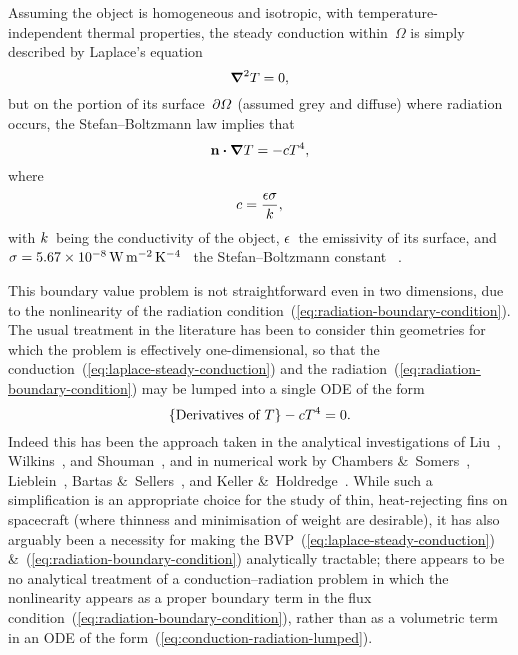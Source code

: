 Assuming the object is homogeneous and isotropic,
with temperature-independent thermal properties,
the steady conduction within~$\Omega$
is simply described by Laplace's equation
\begin{equation}
  \mathop{}\!\boldsymbol{\mathbf{\nabla}}^2 T = 0,
  \label{eq:laplace-steady-conduction}
\end{equation}
but on the portion of its surface~$\mathop{}\!\partial \varOmega$
(assumed grey and diffuse) where radiation occurs,
the Stefan--Boltzmann law implies that
\begin{equation}
  \mathop{}\!\boldsymbol{\mathbf{n}} \boldsymbol{\cdot} \mathop{}\!\boldsymbol{\mathbf{\nabla}} T = - c T^4,
  \label{eq:radiation-boundary-condition}
\end{equation}
where
\begin{equation}
  c = \frac{\epsilon \sigma}{k},
  \label{eq:radiation-constant}
\end{equation}
with $k$~being the conductivity of the object,
$\epsilon$~the emissivity of its surface,
and $\stefan = \SI{5.67e-8}{\watt \per\metre\squared \per\kelvin\tothe{4}}$~%
the Stefan--Boltzmann constant~%
\cite{tiesinga-2019-2018-codata-recommended-constants}.

This boundary value problem is not straightforward
even in two dimensions,
due to the nonlinearity of
the radiation condition~(\ref{eq:radiation-boundary-condition}).
The usual treatment in the literature has been to consider thin geometries
for which the problem is effectively one-dimensional,
so that the conduction~(\ref{eq:laplace-steady-conduction})
and the radiation~(\ref{eq:radiation-boundary-condition})
may be lumped into a single ODE of the form
\begin{equation}
  \{\textnormal{Derivatives of~$T$}\} - c T^4 = 0.
  \label{eq:conduction-radiation-lumped}
\end{equation}
Indeed this has been the approach taken in the analytical investigations of
Liu~\cite{liu-1960-minimum-rectangular-radiating-fins},
Wilkins~\cite{
  wilkins-1960-minumum-mass-fins-radiation,
  wilkins-1961-minimum-mass-fins-thickness,
  wilkins-1962-minimum-mass-fins-gradients,
  wilkins-1974-optimum-shapes-convection-radiation
},
and
Shouman~\cite{shouman-1968-exact-radiation-convection-fin},
and in numerical work by
Chambers \&~Somers~\cite{chambers-1959-radiation-fin-efficiency-circular},
Lieblein~\cite{lieblein-1959-radiant-fin-constant-thickness},
Bartas \&~Sellers~\cite{bartas-1960-radiation-fin-effectiveness},
and
Keller \&~Holdredge~\cite{keller-1970-radiation-annular-fins-trapezoidal}.
While such a simplification is an appropriate choice
for the study of thin, heat-rejecting fins on spacecraft
(where thinness and minimisation of weight are desirable),
it has also arguably been a necessity
for making the BVP~(\ref{eq:laplace-steady-conduction})
\&~(\ref{eq:radiation-boundary-condition}) analytically tractable;
there appears to be no analytical treatment
of a conduction--radiation problem
in which the nonlinearity appears as a proper boundary term
in the flux condition~(\ref{eq:radiation-boundary-condition}),
rather than as a volumetric term in an ODE
of the form~(\ref{eq:conduction-radiation-lumped}).

